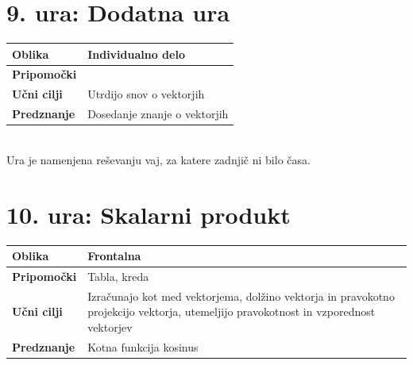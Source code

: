 \documentclass[a4paper,11pt]{article}
\begin{document}
\newpage
\section{9. ura: Dodatna ura}
\begin{tabularx}{\textwidth}{|>{\bfseries\RaggedRight}p{2.7cm}|X|}
\hline
Oblika & Individualno delo \\ \hline
Pripomočki &  \\ \hline
Učni cilji & Utrdijo snov o vektorjih \\ \hline
Predznanje & Dosedanje znanje o vektorjih \\ \hline

\end{tabularx}
\\
Ura je namenjena reševanju vaj, za katere zadnjič ni bilo časa.
\newpage
\section{10. ura: Skalarni produkt}
\begin{tabularx}{\textwidth}{|>{\bfseries\RaggedRight}p{2.7cm}|X|}
\hline
Oblika & Frontalna \\ \hline
Pripomočki & Tabla, kreda \\ \hline
Učni cilji & Izračunajo kot med vektorjema, dolžino vektorja in pravokotno projekcijo vektorja, utemeljijo pravokotnost in vzporednost vektorjev \\ \hline
Predznanje & Kotna funkcija kosinus \\ \hline

\end{tabularx}
\\
\end{document}
